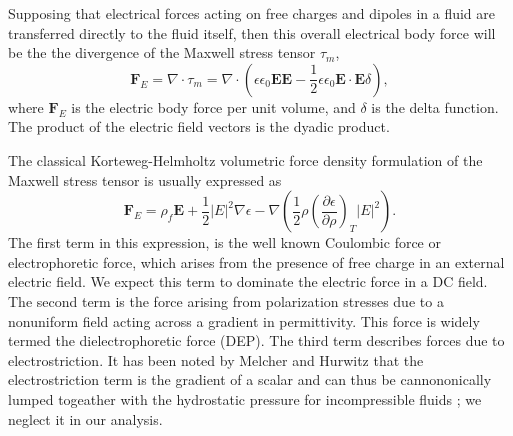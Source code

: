 \documentclass[12pt,a4paper,oneside]{book}
\begin{document}
Supposing that electrical forces acting on free charges and dipoles in a fluid are transferred directly to the fluid itself, then this overall electrical body force will be the the divergence of the Maxwell stress tensor $\tau_m $,
\[ \mathbf{F}_E = \nabla \cdot \tau_m = \nabla \cdot \left( \epsilon \epsilon_0 \mathbf{E} \mathbf{E} - \frac{1}{2} \epsilon \epsilon_0 \mathbf{E} \cdot \mathbf{E} \delta \right) ,\]
where $\mathbf{F}_E$ is the electric body force per unit volume, and $\delta$ is the delta function. The product of the electric field vectors is the dyadic product.  

The classical Korteweg-Helmholtz volumetric force density formulation of the Maxwell stress tensor is usually expressed as \cite{melcher_continuum_????}
\begin{equation}\label{force_density}
\mathbf{F}_E = \rho_f \mathbf{E} + \frac{1}{2} \left| E \right|^2 \nabla \epsilon - \nabla \left( \frac{1}{2} \rho \left( \frac{\partial \epsilon}{\partial \rho} \right)_T \left| E \right|^2 \right) .
\end{equation}
The first term in this expression, is the well known Coulombic force or electrophoretic force, which arises from the presence of free charge in an external electric field. We expect this term to dominate the electric force in a DC field. The second term is the force arising from polarization stresses due to a nonuniform field acting across a gradient in permittivity. This force is widely termed the dielectrophoretic force (DEP). The third term describes forces due to electrostriction. It has been noted by Melcher and Hurwitz that the electrostriction term is the gradient of a scalar and can thus be cannononically lumped togeather with the hydrostatic pressure for incompressible fluids \cite{hurwitz_electrohydrodynamic_1966}; we neglect it in our analysis. 
\end{document}
